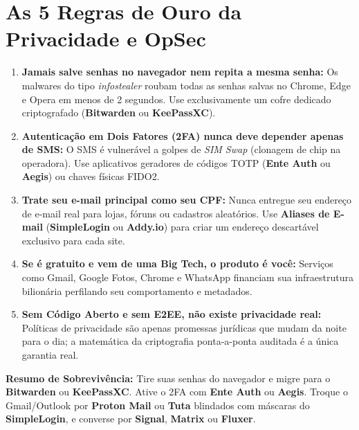 \documentclass{pousadaguide}
\begin{document}
\section{As 5 Regras de Ouro da Privacidade e OpSec}

\begin{enumerate}
  \item \textbf{Jamais salve senhas no navegador nem repita a mesma senha:} Os malwares do tipo \emph{infostealer} roubam todas as senhas salvas no Chrome, Edge e Opera em menos de 2 segundos. Use exclusivamente um cofre dedicado criptografado (\textbf{Bitwarden} ou \textbf{KeePassXC}).
  \item \textbf{Autenticação em Dois Fatores (2FA) nunca deve depender apenas de SMS:} O SMS é vulnerável a golpes de \emph{SIM Swap} (clonagem de chip na operadora). Use aplicativos geradores de códigos TOTP (\textbf{Ente Auth} ou \textbf{Aegis}) ou chaves físicas FIDO2.
  \item \textbf{Trate seu e-mail principal como seu CPF:} Nunca entregue seu endereço de e-mail real para lojas, fóruns ou cadastros aleatórios. Use \textbf{Aliases de E-mail} (\textbf{SimpleLogin} ou \textbf{Addy.io}) para criar um endereço descartável exclusivo para cada site.
  \item \textbf{Se é gratuito e vem de uma Big Tech, o produto é você:} Serviços como Gmail, Google Fotos, Chrome e WhatsApp financiam sua infraestrutura bilionária perfilando seu comportamento e metadados.
  \item \textbf{Sem Código Aberto e sem E2EE, não existe privacidade real:} Políticas de privacidade são apenas promessas jurídicas que mudam da noite para o dia; a matemática da criptografia ponta-a-ponta auditada é a única garantia real.
\end{enumerate}

\begin{tldr}
\textbf{Resumo de Sobrevivência:} Tire suas senhas do navegador e migre para o \textbf{Bitwarden} ou \textbf{KeePassXC}. Ative o 2FA com \textbf{Ente Auth} ou \textbf{Aegis}. Troque o Gmail/Outlook por \textbf{Proton Mail} ou \textbf{Tuta} blindados com máscaras do \textbf{SimpleLogin}, e converse por \textbf{Signal}, \textbf{Matrix} ou \textbf{Fluxer}.
\end{tldr}

\end{document}
